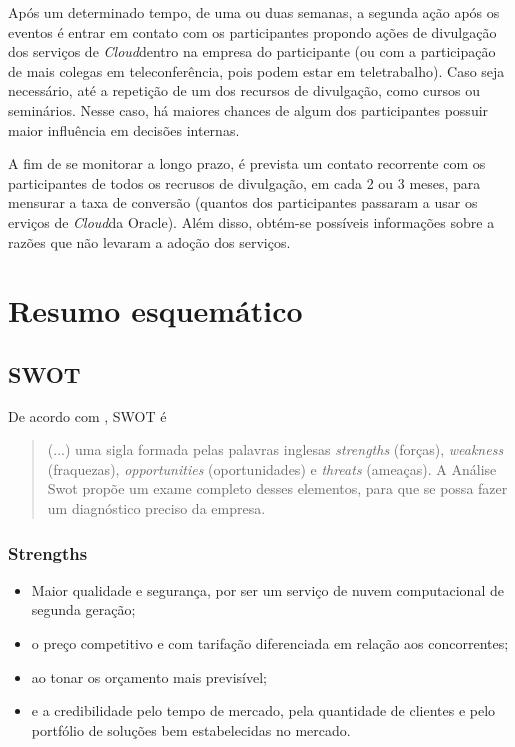 \documentclass[a4paper]{article}
\newcommand{\C}{\emph{Cloud}}
\begin{document}
Após um determinado tempo, de uma ou duas semanas, a segunda ação após os eventos é entrar em contato com os participantes propondo ações de divulgação dos serviços de \C dentro na empresa do participante (ou com a participação de mais colegas em teleconferência, pois podem estar em teletrabalho). Caso seja necessário, até a repetição de um dos recursos de divulgação, como cursos ou seminários. Nesse caso, há maiores chances de algum dos participantes possuir maior influência em decisões internas.

A fim de se monitorar a longo prazo, é prevista um contato recorrente com os participantes de todos os recrusos de divulgação, em cada 2 ou 3 meses, para mensurar a taxa de conversão (quantos dos participantes passaram a usar os erviços de \C da Oracle). Além disso, obtém-se possíveis informações sobre a razões que não levaram a adoção dos serviços.

\section{Resumo esquemático}

\subsection{SWOT}

De acordo com , SWOT é
\begin{quotation}
(...) uma sigla formada pelas palavras inglesas \emph{strengths} (forças), \emph{weakness} (fraquezas), \emph{opportunities} (oportunidades) e \emph{threats} (ameaças). A Análise Swot propõe um exame completo desses
elementos, para que se possa fazer um diagnóstico preciso da empresa.
\end{quotation}

\subsubsection{Strengths}
\begin{itemize}
\item Maior qualidade e segurança, por ser um serviço de nuvem computacional de segunda geração;
\item o preço competitivo e com tarifação diferenciada em relação aos concorrentes;
\item ao tonar os orçamento mais previsível;
\item e a credibilidade pelo tempo de mercado, pela quantidade de clientes e pelo portfólio de soluções bem estabelecidas no mercado.
\end{itemize}
\end{document}
